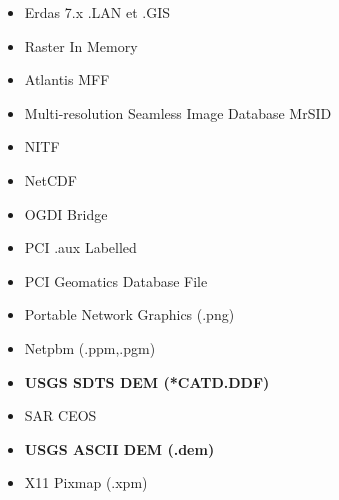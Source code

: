 \begin{itemize}
\item Erdas 7.x .LAN et .GIS
\item Raster In Memory
\item Atlantis MFF
\item Multi-resolution Seamless Image Database  MrSID
\item NITF
\item NetCDF
\item OGDI Bridge
\item PCI .aux Labelled
\item PCI Geomatics Database File
\item Portable Network Graphics (.png)
\item Netpbm (.ppm,.pgm)
\item \textbf{USGS SDTS DEM (*CATD.DDF)}
\item SAR CEOS
\item \textbf{USGS ASCII DEM (.dem)}
\item X11 Pixmap (.xpm)

\end{itemize}
\clearpage
